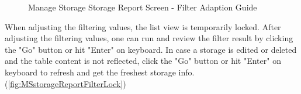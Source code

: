 \begin{figure}[H]
	\centering
    \hspace{5pt}

    \vspace{10pt}
    \caption{Manage Storage Storage Report Screen - Filter Adaption Guide}
	\label{fig:MSstorageReportFilterAdaption}
\end{figure}

When adjusting the filtering values, the list view is temporarily locked. After adjusting the filtering values, one can run and review the filter result by clicking the "Go" button or hit "Enter" on keyboard. In case a storage is edited or deleted and the table content is not reflected, click the "Go" button or hit "Enter" on keyboard to refresh and get the freshest storage info. 
(\autoref{fig:MSstorageReportFilterLock})

